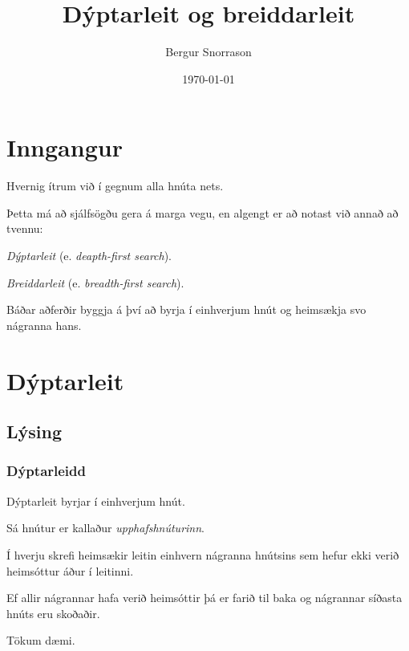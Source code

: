 \title{Dýptarleit og breiddarleit}
\author{Bergur Snorrason}
\date{\today}



\frame{\titlepage}

\section{Inngangur}
{
    {
        \item<1-> Hvernig ítrum við í gegnum alla hnúta nets.
        \item<2-> Þetta má að sjálfsögðu gera á marga vegu, en algengt er að notast við annað að tvennu:
        {
            \item<3-> \emph{Dýptarleit} (e. \emph{deapth-first search}).
            \item<4-> \emph{Breiddarleit} (e. \emph{breadth-first search}).
        }
        \item<5-> Báðar aðferðir byggja á því að byrja í einhverjum hnút og heimsækja svo nágranna hans.
    }
}

\section{Dýptarleit}
\subsection{Lýsing}
{
    \frametitle{Dýptarleidd}
    {
        \item<1-> Dýptarleit byrjar í einhverjum hnút.
        \item<2-> Sá hnútur er kallaður \emph{upphafshnúturinn}.
        \item<3-> Í hverju skrefi heimsækir leitin einhvern nágranna hnútsins sem hefur ekki verið heimsóttur áður í leitinni.
        \item<4-> Ef allir nágrannar hafa verið heimsóttir þá er farið til baka og nágrannar síðasta hnúts eru skoðaðir.
        \item<5-> Tökum dæmi.
    }
}

